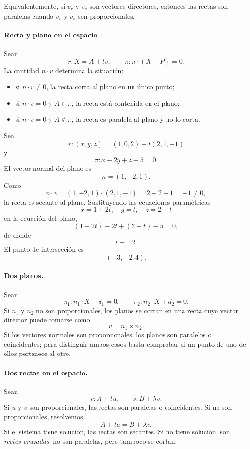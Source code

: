 Equivalentemente, si $v_r$ y $v_s$ son vectores directores, entonces las rectas son paralelas cuando $v_r$ y $v_s$ son proporcionales.

\paragraph{Recta y plano en el espacio.}
Sean
\[
r:X=A+tv,
\qquad
\pi:n\cdot(X-P)=0.
\]
La cantidad $n\cdot v$ determina la situación:
\begin{itemize}
\item si $n\cdot v\neq0$, la recta corta al plano en un único punto;
\item si $n\cdot v=0$ y $A\in\pi$, la recta está contenida en el plano;
\item si $n\cdot v=0$ y $A\notin\pi$, la recta es paralela al plano y no lo corta.
\end{itemize}

\begin{example}
Sea
\[
r:(x,y,z)=(1,0,2)+t(2,1,-1)
\]
y
\[
\pi: x-2y+z-5=0.
\]
El vector normal del plano es
\[
n=(1,-2,1).
\]
Como
\[
n\cdot v=(1,-2,1)\cdot(2,1,-1)=2-2-1=-1\neq0,
\]
la recta es secante al plano. Sustituyendo las ecuaciones paramétricas
\[
x=1+2t,\quad y=t,\quad z=2-t
\]
en la ecuación del plano,
\[
(1+2t)-2t+(2-t)-5=0,
\]
de donde
\[
t=-2.
\]
El punto de intersección es
\[
\boxed{(-3,-2,4).}
\]
\end{example}

\paragraph{Dos planos.}
Sean
\[
\pi_1:n_1\cdot X+d_1=0,
\qquad
\pi_2:n_2\cdot X+d_2=0.
\]
Si $n_1$ y $n_2$ no son proporcionales, los planos se cortan en una recta cuyo vector director puede tomarse como
\[
v=n_1\times n_2.
\]
Si los vectores normales son proporcionales, los planos son paralelos o coincidentes; para distinguir ambos casos basta comprobar si un punto de uno de ellos pertenece al otro.

\paragraph{Dos rectas en el espacio.}
Sean
\[
r:A+tu,
\qquad
s:B+\lambda v.
\]
Si $u$ y $v$ son proporcionales, las rectas son paralelas o coincidentes. Si no son proporcionales, resolvemos
\[
A+tu=B+\lambda v.
\]
Si el sistema tiene solución, las rectas son secantes. Si no tiene solución, son \emph{rectas cruzadas}: no son paralelas, pero tampoco se cortan.

